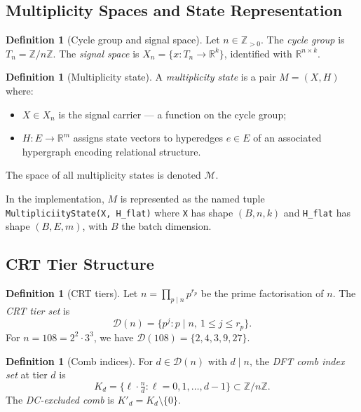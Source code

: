 \documentclass[11pt,a4paper]{article}
\theoremstyle{plain}
\theoremstyle{definition}
\newtheorem{definition}[theorem]{Definition}
\theoremstyle{remark}
\newcommand{\tiers}{\mathcal{D}}
\newcommand{\multsp}{\mathcal{M}}
\begin{document}
\subsection{Multiplicity Spaces and State Representation}

\begin{definition}[Cycle group and signal space]
  Let $n \in \mathbb{Z}_{>0}$. The \emph{cycle group} is $T_n = \mathbb{Z}/n\mathbb{Z}$.
  The \emph{signal space} is $X_n = \{x : T_n \to \mathbb{R}^k\}$, identified with
  $\mathbb{R}^{n \times k}$.
\end{definition}

\begin{definition}[Multiplicity state]
  A \emph{multiplicity state} is a pair $M = (X, H)$ where:
  \begin{itemize}[itemsep=2pt]
    \item $X \in X_n$ is the signal carrier --- a function on the cycle group;
    \item $H : E \to \mathbb{R}^m$ assigns state vectors to hyperedges $e \in E$
      of an associated hypergraph encoding relational structure.
  \end{itemize}
  The space of all multiplicity states is denoted $\multsp$.
\end{definition}

In the implementation, $M$ is represented as the named tuple
\texttt{MultipliciityState(X, H\_flat)} where \texttt{X} has shape $(B, n, k)$
and \texttt{H\_flat} has shape $(B, E, m)$, with $B$ the batch dimension.

\subsection{CRT Tier Structure}

\begin{definition}[CRT tiers]
  Let $n = \prod_{p \mid n} p^{r_p}$ be the prime factorisation of $n$.
  The \emph{CRT tier set} is
  \[
    \tiers(n) = \{ p^j : p \mid n,\ 1 \le j \le r_p \}.
  \]
  For $n = 108 = 2^2 \cdot 3^3$, we have $\tiers(108) = \{2, 4, 3, 9, 27\}$.
\end{definition}

\begin{definition}[Comb indices]
  For $d \in \tiers(n)$ with $d \mid n$, the \emph{DFT comb index set} at tier $d$ is
  \[
    K_d = \bigl\{ \ell \cdot \tfrac{n}{d} : \ell = 0, 1, \ldots, d-1 \bigr\} \subset \mathbb{Z}/n\mathbb{Z}.
  \]
  The \emph{DC-excluded comb} is $K'_d = K_d \setminus \{0\}$.
\end{definition}
\end{document}
